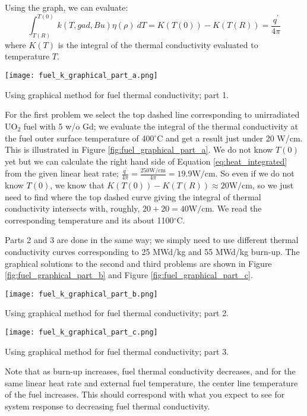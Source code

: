 Using the graph, we can evaluate:
\begin{equation}
\int_{T(R)}^{T(0)} k(T,gad,Bu)\eta(\rho) \ dT = K(T(0)) - K(T(R)) = \frac{q^{\prime}}{4 \pi}
\label{eq:heat_integrated}
\end{equation}
where $K(T)$ is the integral of the thermal conductivity evaluated to temperature $T$.

\begin{marginfigure}
\texttt{[image: fuel\_k\_graphical\_part\_a.png]}
\caption{Using graphical method for fuel thermal conductivity; part 1.}
\label{fig:fuel_graphical_part_a}
\end{marginfigure}
For the first problem we select the top dashed line corresponding to unirradiated UO$_2$ fuel with 5 w/o Gd; we evaluate the integral of the thermal conductivity at the fuel outer surface temperature of 400$^{\circ}$C and get a result just under 20 W/cm.  This is illustrated in Figure \ref{fig:fuel_graphical_part_a}.  We do not know $T(0)$ yet but we can calculate the right hand side of Equation \ref{eq:heat_integrated} from the given linear heat rate; $\frac{q^{\prime}}{4 \pi} = \frac{250 \text{W/cm}}{4 \pi} = 19.9 \text{W/cm}$. So even if we do not know $T(0)$, we know that $K(T(0)) - K(T(R)) \approx 20 \text{W/cm}$, so we just need to find where the top dashed curve giving the integral of thermal conductivity intersects with, roughly, $20 + 20 = 40 \text{W/cm}$.  We read the corresponding temperature and its about 1100$^{\circ}$C.

Parts 2 and 3 are done in the same way; we simply need to use different thermal conductivity curves corresponding to 25 MWd/kg and 55 MWd/kg burn-up. The graphical solutions to the second and third problems are shown in Figure \ref{fig:fuel_graphical_part_b} and Figure \ref{fig:fuel_graphical_part_c}.

\begin{marginfigure}
\texttt{[image: fuel\_k\_graphical\_part\_b.png]}
\caption{Using graphical method for fuel thermal conductivity; part 2.}
\label{fig:fuel_graphical_part_b}
\end{marginfigure}

\begin{marginfigure}
\texttt{[image: fuel\_k\_graphical\_part\_c.png]}
\caption{Using graphical method for fuel thermal conductivity; part 3.}
\label{fig:fuel_graphical_part_c}
\end{marginfigure}
Note that as burn-up increases, fuel thermal conductivity decreases, and for the same linear heat rate and external fuel temperature, the center line temperature of the fuel increases.  This should correspond with what you expect to see for system response to decreasing fuel thermal conductivity.

